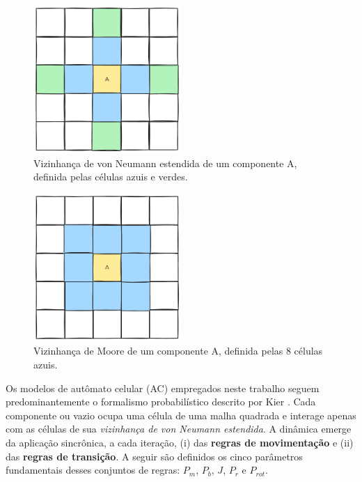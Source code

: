 \documentclass[12pt,oneside]{report}
\begin{document}
\begin{figure}[H]
    \centering
    \includegraphics[width=0.5\textwidth]{vizinhanca_von_neumann_estendida.png}
    \caption{\small Vizinhança de von Neumann estendida de um componente A, definida pelas células azuis e verdes.}
    \label{fig:vizinhanca_von_neumann_estendida}
\end{figure}

\begin{figure}[H]
    \centering
    \includegraphics[width=0.5\textwidth]{vizinhanca_moore.png}
    \caption{\small Vizinhança de Moore de um componente A, definida pelas 8 células azuis.}
    \label{fig:vizinhanca_moore}
\end{figure}

Os modelos de autômato celular (AC) empregados neste trabalho seguem predominantemente o formalismo probabilístico descrito por Kier \cite{kier2005}. Cada componente ou vazio ocupa uma célula de uma malha quadrada e interage apenas com as células de sua \textit{vizinhança de von Neumann estendida}. A dinâmica emerge da aplicação sincrônica, a cada iteração, (i) das \textbf{regras de movimentação} e (ii) das \textbf{regras de transição}. A seguir são definidos os cinco parâmetros fundamentais desses conjuntos de regras: $P_m$, $P_b$, $J$, $P_r$ e $P_{rot}$.
\end{document}
